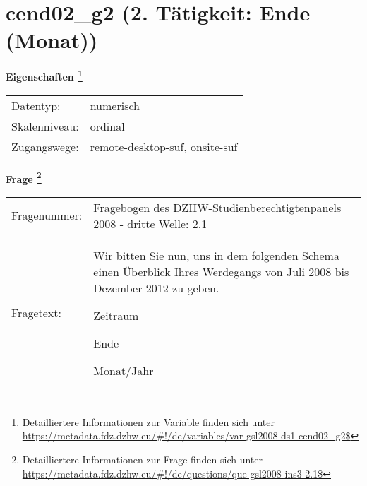 
    \setcounter{footnote}{0}

    \vspace*{-1.8cm}
	\section{cend02\_g2 (2. Tätigkeit: Ende (Monat))}
	\label{section:cend02_g2}



    \vspace*{0.5cm}
    \noindent\textbf{Eigenschaften
	\footnote{Detailliertere Informationen zur Variable finden sich unter
		\url{https://metadata.fdz.dzhw.eu/\#!/de/variables/var-gsl2008-ds1-cend02_g2$}}}\\
	\begin{tabularx}{\hsize}{@{}lX}
	Datentyp: & numerisch \\
	Skalenniveau: & ordinal \\
	Zugangswege: &
	  remote-desktop-suf, 
	  onsite-suf
 \\
    \end{tabularx}



				\vspace*{0.5cm}
                \noindent\textbf{Frage
	                \footnote{Detailliertere Informationen zur Frage finden sich unter
		              \url{https://metadata.fdz.dzhw.eu/\#!/de/questions/que-gsl2008-ins3-2.1$}}}\\
				\begin{tabularx}{\hsize}{@{}lX}
					Fragenummer: &
					  Fragebogen des DZHW-Studienberechtigtenpanels 2008 - dritte Welle:
					  2.1
 \\
					Fragetext: & Wir bitten Sie nun, uns in dem folgenden Schema einen Überblick Ihres Werdegangs von Juli 2008 bis Dezember 2012 zu geben.\par  Zeitraum\par  Ende\par  Monat/Jahr \\
				\end{tabularx}





